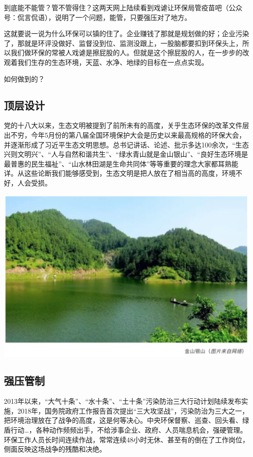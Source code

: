 \documentclass[]{book}
\begin{document}
到底能不能管？管不管得住？这两天网上陆续看到戏谑让环保局管疫苗吧（公众号：侃言侃语），说明了一个问题，能管，只要强压对了地方。

这就要说一说为什么环保可以镇的住了。企业赚钱了那就是规划做的好；企业污染了，那就是环评没做好、监督没到位、监测没跟上，一股脑都要扣到环保头上，所以我们做环保的常被人戏谑是擦屁股的人。但就是这个擦屁股的人，在一步步的改观着我们生存的生态环境，天蓝、水净、地绿的目标在一点点实现。

如何做到的？

\hypertarget{ux9876ux5c42ux8bbeux8ba1}{%
\subsection{顶层设计}\label{ux9876ux5c42ux8bbeux8ba1}}

党的十八大以来，生态文明被提到了前所未有的高度，关乎生态环保的改革文件层出不穷，今年5月份的第八届全国环境保护大会是历史以来最高规格的环保大会，并逐渐形成了习近平生态文明思想。总书记讲话、论述、批示多达100余次，``生态兴则文明兴''、``人与自然和谐共生''、``绿水青山就是金山银山''、``良好生态环境是最普惠的民生福祉''、``山水林田湖是生命共同体''等等重要的理念大家都耳熟能详。从这些论断我们能够感受到，生态文明是把人放在了相当高的高度，环境不好，人会受损。

\includegraphics[width=6.67in]{images/fw2}

\hypertarget{ux5f3aux538bux7ba1ux5236}{%
\subsection{强压管制}\label{ux5f3aux538bux7ba1ux5236}}

2013年以来，``大气十条''、``水十条''、``土十条''污染防治三大行动计划陆续发布实施，2018年，国务院政府工作报告首次提出``三大攻坚战''，污染防治为三大之一，把环境治理放在了战争的高度，这是何等决心。中央环保督察、巡查、回头看、绿盾行动\ldots{}，各种动作频频出手，不给涉事企业、政府、人员喘息机会，强硬管理。环保工作人员长时间连续作战，常常连续48小时无休、甚至有的倒在了工作岗位，侧面反映这场战争的残酷和决绝。
\end{document}
